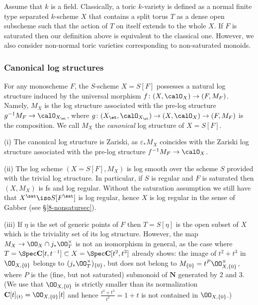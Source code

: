 \documentclass[10pt]{../fichiers-configuration-latex/smfart}
\begin{document}
\begin{remark2} Assume that $k$ is a field. Classically, a toric
$k$-variety is defined as a normal finite type separated $k$-scheme
$X$ that contains a split torus $T$ as a dense open subscheme such
that the action of $T$ on itself extends to the whole $X$. If
$F$ is saturated then our definition above is equivalent to the
classical one. However, we also consider non-normal toric varieties
corresponding to non-saturated monoids.  \end{remark2}

\subsubsection{Canonical log structures}\label{8-canonsec}
For any monoscheme $F$, the $S$-scheme $X=S[F]$ possesses
a natural log structure induced by the universal morphism
$f{\colon}(X,\calO_X)\to(F,M_F)$. Namely, $M_X$ is the log structure
associated with the pre-log structure $g^{-1}M_F\to\calO_{X_\et}$,
where $g{\colon}(X_\et,\calO_{X_\et})\to(X,\calO_X)\to(F,M_F)$ is
the composition. We call $M_X$ the {\em canonical} log structure
of $X=S[F]$.

\begin{remark2}\label{8-canonrem} (i) The canonical log
structure is Zariski, as $\varepsilon_* M_X$ coincides with
the Zariski log structure associated with the pre-log structure
$f^{-1}M_F\to\calO_X$.

(ii) The log scheme $(X=S[F],M_X)$ is log smooth over the scheme
$S$ provided with the trivial log structure. In particular,
if $S$ is regular and $F$ is saturated then $(X,M_X)$ is fs and
log regular. Without the saturation assumption we still have that
$X^\sat\iso S[F^\sat]$ is log regular, hence $X$ is log regular
in the sense of Gabber (see \S\ref{8-nonsatursec}).

(iii) If $\eta$ is the set of generic points of $F$ then $T=S[\eta]$
is the open subset of $X$ which is the triviality set of its
log structure. However, the map $M_{X} \to \OO_X
\cap j_* \OO_{T}^\times$ is not an isomorphism in
general, as the case where $T = \Spec \mathbf{C}[t,t^{-1}]
\subset X = \Spec \mathbf{C}[t^2,t^3]$ already shows: the
image of $t^2 + t^3$ in $\OO_{X,\{0\}}$ belongs to $(
j_*\OO_{T}^\times)_{\{0\}}$, but does not belong to
$M_{\{0\}} = t^{P}\OO_{X,\{0\}}^\times$, where $P$ is the
(fine, but not saturated) submonoid of $\mathbf{N}$ generated by 2
and 3. (We use that $\OO_{X,\{0\}}$ is strictly smaller than
its normalization $\mathbf{C}[t]_{(t)}=\OO_{X,\{0\}}[t]$
and hence $\frac{t^2+t^3}{t^2}=1+t$ is not contained in
$\OO_{X,\{0\}}$.)  \end{remark2}
\end{document}
